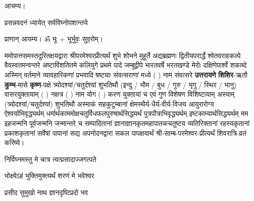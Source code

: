 
\setlength{\parindent}{0pt}

आचम्य।

{प्रसन्नवदनं ध्यायेत् सर्वविघ्नोपशान्तये}
 
प्राणान्  आयम्य।  ॐ भूः + भूर्भुवः॒ सुव॒रोम्।


ममोपात्तसमस्तदुरितक्षयद्वारा श्रीपरमेश्वरप्रीत्यर्थं शुभे शोभने मुहूर्ते अद्यब्रह्मणः
द्वितीयपरार्द्धे श्वेतवराहकल्पे वैवस्वतमन्वन्तरे अष्टाविंशतितमे कलियुगे प्रथमे पादे
जम्बूद्वीपे भारतवर्षे भरतखण्डे मेरोः दक्षिणेपार्श्वे शकाब्दे अस्मिन् वर्तमाने व्यावहारिकणां
 प्रभवादि षष्ट्याः संवत्सराणां मध्ये (	) नाम संवत्सरे \textbf{उत्तरायणे} 
\textbf{शिशिर}-ऋतौ  \textbf{कुम्भ}-मासे \textbf{कृष्ण}-पक्षे त्र्योदश्यां/चतुर्दश्यां शुभतिथौ
(इन्दु / भौम / बुध / गुरु / भृगु / स्थिर / भानु) वासरयुक्तायाम्
(  ) नक्षत्र (  ) नाम  योग  (  ) करण युक्तायां च एवं गुण विशेषण विशिष्टायाम्
अस्याम् (त्र्योदश्यां/चतुर्दश्यां) शुभतिथौ 
अस्माकं सहकुटुम्बानां क्षेमस्थैर्य-धैर्य-वीर्य-विजय आयुरारोग्य ऐश्वर्याभिवृद्ध्यर्थम्
 धर्मार्थकाममोक्ष\-चतुर्विधफलपुरुषार्थसिद्ध्यर्थं पुत्रपौत्राभि\-वृद्ध्यर्थम् इष्टकाम्यार्थसिद्ध्यर्थम्
मम इहजन्मनि पूर्वजन्मनि जन्मान्तरे च सम्पादितानां ज्ञानाज्ञानकृतमहा\-पातकचतुष्टय
व्यतिरिक्तानां रहस्यकृतानां प्रकाशकृतानां सर्वेषां पापानां सद्य अपनोदनद्वारा सकल 
पापक्षयार्थं श्री-साम्ब-परमेश्वर-प्रीत्यर्थं शिवरात्रि-व्रतं करिष्ये।

{निर्विघ्नमस्तु मे चात्र त्वत्प्रसादाज्जगत्पते}

{भोक्ष्येऽहं भुक्तिमुक्त्यर्थं शरणं मे भवेश्वर}


















{प्रसीद सुमुखो नाथ ज्ञानदृष्टिप्रदो भव}

\closesection

